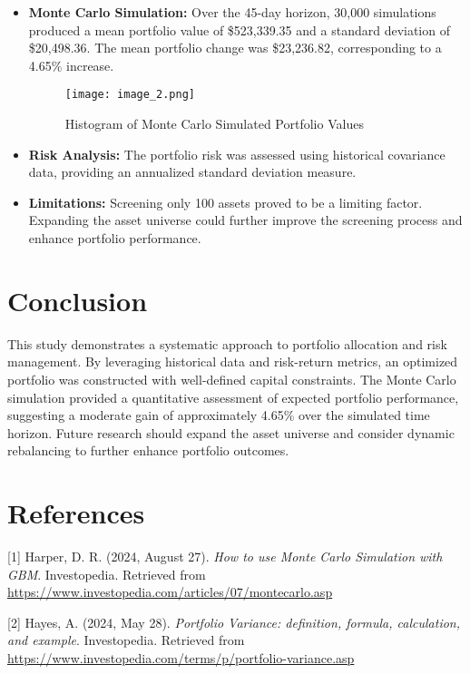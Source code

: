 \documentclass[11pt]{article}
\begin{document}
\begin{itemize}
    \item \textbf{Monte Carlo Simulation:} Over the 45-day horizon, 30,000 simulations produced a mean portfolio value of \$523,339.35 and a standard deviation of \$20,498.36. The mean portfolio change was \$23,236.82, corresponding to a 4.65\% increase.
    \begin{figure}[H]
    \centering
    \texttt{[image: image\_2.png]}
    \caption{Histogram of Monte Carlo Simulated Portfolio Values}
    \label{fig:monte_carlo}
\end{figure}

    \item \textbf{Risk Analysis:} The portfolio risk was assessed using historical covariance data, providing an annualized standard deviation measure.
    \item \textbf{Limitations:} Screening only 100 assets proved to be a limiting factor. Expanding the asset universe could further improve the screening process and enhance portfolio performance.
\end{itemize}

\section{Conclusion}
This study demonstrates a systematic approach to portfolio allocation and risk management. By leveraging historical data and risk-return metrics, an optimized portfolio was constructed with well-defined capital constraints. The Monte Carlo simulation provided a quantitative assessment of expected portfolio performance, suggesting a moderate gain of approximately 4.65\% over the simulated time horizon. Future research should expand the asset universe and consider dynamic rebalancing to further enhance portfolio outcomes.

\clearpage
\section*{References}
[1] Harper, D. R. (2024, August 27). \textit{How to use Monte Carlo Simulation with GBM}. Investopedia. Retrieved from \url{https://www.investopedia.com/articles/07/montecarlo.asp}

[2] Hayes, A. (2024, May 28). \textit{Portfolio Variance: definition, formula, calculation, and example}. Investopedia. Retrieved from \url{https://www.investopedia.com/terms/p/portfolio-variance.asp}
\end{document}
